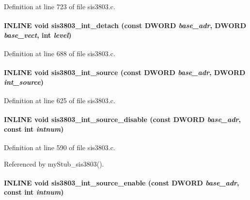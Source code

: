 Definition at line 723 of file sis3803.c.
\paragraph[{sis3803\_\-int\_\-detach}]{\setlength{\rightskip}{0pt plus 5cm}INLINE void sis3803\_\-int\_\-detach (const {\bf DWORD} {\em base\_\-adr}, \/  {\bf DWORD} {\em base\_\-vect}, \/  int {\em level})}\hfill\label{sis3803_8c_a18dbc998ed925f1f96f9c90a713fc5f3}


Definition at line 688 of file sis3803.c.
\paragraph[{sis3803\_\-int\_\-source}]{\setlength{\rightskip}{0pt plus 5cm}INLINE void sis3803\_\-int\_\-source (const {\bf DWORD} {\em base\_\-adr}, \/  {\bf DWORD} {\em int\_\-source})}\hfill\label{sis3803_8c_a8e196e5ec8a964a50bd801e8be0c604e}


Definition at line 625 of file sis3803.c.
\paragraph[{sis3803\_\-int\_\-source\_\-disable}]{\setlength{\rightskip}{0pt plus 5cm}INLINE void sis3803\_\-int\_\-source\_\-disable (const {\bf DWORD} {\em base\_\-adr}, \/  const int {\em intnum})}\hfill\label{sis3803_8c_ae710f91ba05a4d828a0a5d3b21848673}


Definition at line 590 of file sis3803.c.

Referenced by myStub\_\-sis3803().
\paragraph[{sis3803\_\-int\_\-source\_\-enable}]{\setlength{\rightskip}{0pt plus 5cm}INLINE void sis3803\_\-int\_\-source\_\-enable (const {\bf DWORD} {\em base\_\-adr}, \/  const int {\em intnum})}\hfill\label{sis3803_8c_a01ec0bc5dda3f74b2fcb9e644104b411}


